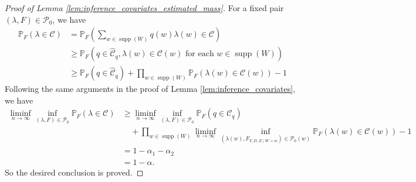 \documentclass[11pt]{article}
\theoremstyle{definition}
\DeclareMathOperator*{\supp}{supp}
\newcommand{\Prob}{\ensuremath{\mathbb{P}}} %
\newcommand{\0}{\ensuremath{\mathbf{0}}}
\begin{document}
\begin{bibunit}
\begin{proof}[Proof of Lemma \ref{lem:inference_covariates_estimated_mass}]
	For a fixed pair $(\lambda,F)\in\mathcal{P}_0$, we have 
\begin{align*}
	\Prob_F(\lambda\in {\mathcal{C}}) 
	&= \Prob_F\left(\sum_{w\in\supp(W)}q(w)\lambda(w) \in {\mathcal{C}}\right) \\
	&\geq \Prob_F\left(q\in\hat{\mathcal{C}}_q, \lambda(w) \in {\mathcal{C}}(w) \text{ for each } w\in\supp(W) \right) \\
	&\geq \Prob_F\left(q\in\hat{\mathcal{C}}_q\right) + \prod_{w\in\supp(W)} \Prob_F\left(\lambda(w)\in {\mathcal{C}}(w)\right) - 1
\end{align*}
Following the same arguments in the proof of Lemma \ref{lem:inference_covariates}, we have 
\begin{align*}
	\liminf_{n\to\infty}\inf_{(\lambda,F)\in\mathcal{P}_0} \Prob_F(\lambda \in {\mathcal{C}}) 
	& \geq \liminf_{n\to\infty}\inf_{(\lambda,F)\in\mathcal{P}_0}\Prob_F\left(q\in{\mathcal{C}}_q\right) \\
	& \quad + \prod_{w\in\supp(W)} \liminf_{n\to\infty}\inf_{(\lambda(w),F_{Y,D,Z\mid W=w})\in\mathcal{P}_0(w)} \Prob_F\left(\lambda(w)\in{\mathcal{C}}(w)\right) - 1 \\
	& = 1-\alpha_1-\alpha_2 \\
	& = 1-\alpha.
\end{align*}
So the desired conclusion is proved.
\end{proof}






\end{bibunit}
\end{document}
